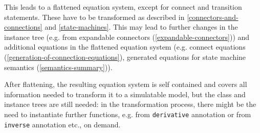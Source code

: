 This leads to a flattened equation system, except for connect and transition statements. These have to be transformed as described in
\autoref{connectors-and-connections} and \autoref{state-machines}.  This may lead to further changes in the instance tree (e.g. from expandable connectors
(\autoref{expandable-connectors})) and additional equations in the flattened equation system (e.g. connect equations (\autoref{generation-of-connection-equations}),
generated equations for state machine semantics (\autoref{semantics-summary})).

\begin{nonnormative}
After flattening, the resulting equation system is self
contained and covers all information needed to transform it to a
simulatable model, but the class and instance trees are still needed: in
the transformation process, there might be the need to instantiate
further functions, e.g. from \lstinline!derivative! annotation or from \lstinline!inverse!
annotation etc., on demand.
\end{nonnormative}
